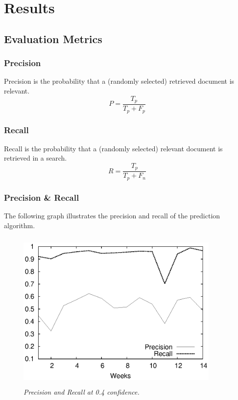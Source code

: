 %

\chapter{Results}

\section{Evaluation Metrics}

\subsection{Precision}
Precision is the probability that a (randomly selected) retrieved document is relevant.
\begin{equation}
P = \frac{T_p}{T_p + F_p} \nonumber
\end{equation}

\subsection{Recall}
Recall is the probability that a (randomly selected) relevant document is retrieved in a search.
\begin{equation}
R = \frac{T_p}{T_p + F_n} \nonumber
\end{equation}

\subsection{Precision \& Recall}
The following graph illustrates the precision and recall of the prediction algorithm.
	\begin{figure}[t]
		\begin{center}
			\includegraphics[width=10cm,height=8cm]{figures/precision.eps} 
			\caption{\small \sl Precision and Recall at 0.4 confidence.\label{fig:Label7}} 
		\end{center} 
	\end{figure}

